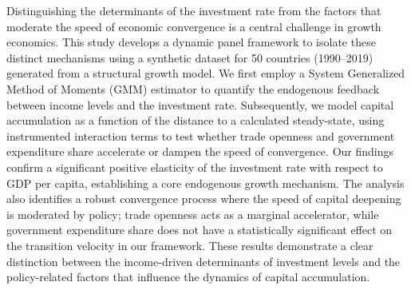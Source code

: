 \documentclass[]{article}
\begin{document}
Distinguishing the determinants of the investment rate from the factors that moderate the speed of economic convergence is a central challenge in growth economics. This study develops a dynamic panel framework to isolate these distinct mechanisms using a synthetic dataset for 50 countries (1990–2019) generated from a structural growth model. We first employ a System Generalized Method of Moments (GMM) estimator to quantify the endogenous feedback between income levels and the investment rate. Subsequently, we model capital accumulation as a function of the distance to a calculated steady-state, using instrumented interaction terms to test whether trade openness and government expenditure share accelerate or dampen the speed of convergence. Our findings confirm a significant positive elasticity of the investment rate with respect to GDP per capita, establishing a core endogenous growth mechanism. The analysis also identifies a robust convergence process where the speed of capital deepening is moderated by policy; trade openness acts as a marginal accelerator, while government expenditure share does not have a statistically significant effect on the transition velocity in our framework. These results demonstrate a clear distinction between the income-driven determinants of investment levels and the policy-related factors that influence the dynamics of capital accumulation.
\end{document}
